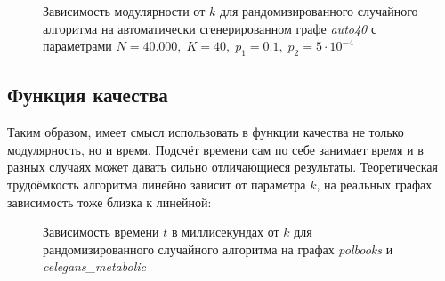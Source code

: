 \begin{figure}[H]
	\caption{Зависимость модулярности от $k$ для рандомизированного случайного алгоритма на автоматически сгенерированном графе \emph{auto40} с параметрами $N = 40.000,\;K = 40,\;p_1 = 0.1,\;p_2 = 5\cdot 10^{-4}$}
	\label{fig:q-auto13}
\end{figure}



\subsection{Функция качества}

Таким образом, имеет смысл использовать в функции качества не только модулярность, но и время. Подсчёт времени сам по себе занимает время и в разных случаях может давать сильно отличающиеся результаты. Теоретическая трудоёмкость алгоритма линейно зависит от параметра $k$, на реальных графах зависимость тоже близка к линейной:

\begin{figure}[H]
	\columnwidth
	\caption{Зависимость времени $t$ в миллисекундах от $k$ для рандомизированного случайного алгоритма на графах \emph{polbooks} и \emph{celegans\_metabolic}}
\end{figure}

